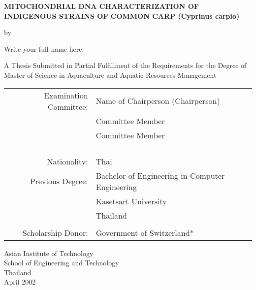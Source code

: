 \begin{titlepage}
  \begin{center}
   
  \textbf{\large{
  MITOCHONDRIAL DNA CHARACTERIZATION OF INDIGENOUS STRAINS OF COMMON CARP (Cyprinus carpio)
  }}

  \vspace{3em} %
  
  by
  
  \vspace{3em} %
  
  Write your full name here.
  
  \vspace{4em} %

  A Thesis Submitted in Partial Fulfillment of the Requirements for the Degree of Master of Science in Aquaculture and Aquatic Resources Management

  \vspace{4em} %

\begin{center}
  \begin{tabular}{ rl }
Examination Committee: & Name of Chairperson (Chairperson) \\
                       & Committee Member \\ 
                       & Committee Member \\\\
                       
\\ \\ \\
Nationality:     & Thai \\
Previous Degree: & Bachelor of Engineering in Computer Engineering \\
                 & Kasetsart University \\
                 & Thailand \\
\\
Scholarship Donor: & Government of Switzerland*
  \end{tabular}
\end{center}

\vspace{4em}

Asian Institute of Technology \\
School of Engineering and Technology \\
Thailand \\ 
April 2002


  \end{center}
\end{titlepage}
